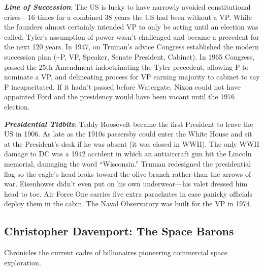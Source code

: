 \documentclass[
]{article}
\begin{document}
\textbf{\emph{Line of Succession}}: The US is lucky to have narrowly
avoided constitutional crises---16 times for a combined 38 years the US
had been without a VP. While the founders almost certainly intended VP
to only be acting until an election was called, Tyler's assumption of
power wasn't challenged and became a precedent for the next 120 years.
In 1947, on Truman's advice Congress established the modern succession
plan (\textasciitilde P, VP, Speaker, Senate President, Cabinet). In
1965 Congress, passed the 25th Amendment indoctrinating the Tyler
precedent, allowing P to nominate a VP, and delineating process for VP
earning majority to cabinet to say P incapacitated. If it hadn't passed
before Watergate, Nixon could not have appointed Ford and the presidency
would have been vacant until the 1976 election.

\textbf{\emph{Presidential Tidbits}}: Teddy Roosevelt became the first
President to leave the US in 1906. As late as the 1910s passersby could
enter the White House and sit at the President's desk if he was absent
(it was closed in WWII). The only WWII damage to DC was a 1942 accident
in which an antiaircraft gun hit the Lincoln memorial, damaging the word
``Wisconsin.'' Truman redesigned the presidential flag so the eagle's
head looks toward the olive branch rather than the arrows of war.
Eisenhower didn't even put on his own underwear---his valet dressed him
head to toe. Air Force One carries five extra parachutes in case panicky
officials deploy them in the cabin. The Naval Observatory was built for
the VP in 1974.

\hypertarget{christopher-davenport-the-space-barons}{%
\subsection{Christopher Davenport: The Space
Barons}\label{christopher-davenport-the-space-barons}}

Chronicles the current cadre of billionaires pioneering commercial space
exploration.
\end{document}
